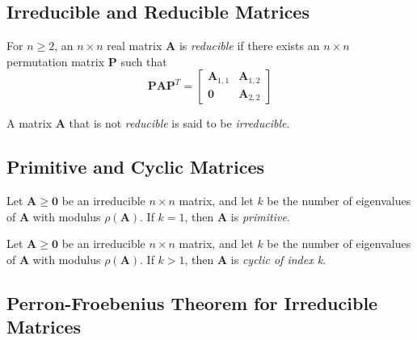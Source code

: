 \subsection{Irreducible and Reducible Matrices}
				
\begin{definition}
For $n \ge 2$, an $n \times n$ real matrix $\mathbf{A}$ is \textit{reducible} if there exists an $n \times n$ permutation matrix $\mathbf{P}$ such that
	\begin{equation*}
		\mathbf{P}\mathbf{A}\mathbf{P}^{T} = 
		\begin{bmatrix} 
		\mathbf{A}_{1,1} & \mathbf{A}_{1,2} \\ 
		\mathbf{0} & \mathbf{A}_{2,2} 
		\end{bmatrix}
	\end{equation*}
\end{definition}

\begin{definition}
A matrix $\mathbf{A}$ that is not \textit{reducible} is said to be \textit{irreducible}.
\end{definition}

\subsection{Primitive and Cyclic Matrices}
			
\begin{definition}
Let $\mathbf{A} \ge \mathbf{0}$ be an irreducible $n \times n$ matrix, and let $k$ be the number of eigenvalues of $\mathbf{A}$ with modulus $\rho(\mathbf{A})$. If $k = 1$, then $\mathbf{A}$ is \textit{primitive}.
\end{definition}


\begin{definition}
Let $\mathbf{A} \ge \mathbf{0}$ be an irreducible $n \times n$ matrix, and let $k$ be the number of eigenvalues of $\mathbf{A}$ with modulus $\rho(\mathbf{A})$. If $k > 1$, then $\mathbf{A}$ is \textit{cyclic of index k}.
\end{definition}

\subsection{Perron-Froebenius Theorem for Irreducible Matrices}

